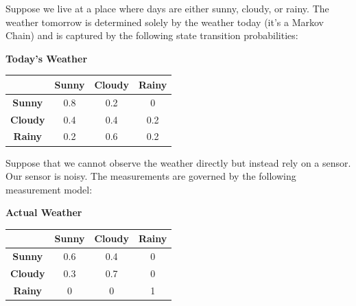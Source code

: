 \documentclass[answers]{exam}
\begin{document}
\begin{questions}

    \question[20]
    Suppose we live at a place where days are either sunny, cloudy, or rainy. The weather tomorrow is determined solely by the weather today (it’s a Markov Chain) and is captured by the following state transition probabilities:
    \begin{center}
        \textbf{Today's Weather} \\
        \begin{tabular}{|c|c|c|c|}
            \hline
            \textbf{}       & \textbf{Sunny} & \textbf{Cloudy} & \textbf{Rainy} \\ \hline
            \textbf{Sunny}  & 0.8            & 0.2             & 0              \\ \hline
            \textbf{Cloudy} & 0.4            & 0.4             & 0.2            \\ \hline
            \textbf{Rainy}  & 0.2            & 0.6             & 0.2            \\ \hline
        \end{tabular}
    \end{center}
    Suppose that we cannot observe the weather directly but instead rely on a sensor. Our sensor is noisy. The measurements are governed by the following measurement model:
    \begin{center}
        \textbf{Actual Weather} \\
        \begin{tabular}{|c|c|c|c|}
            \hline
            \textbf{}       & \textbf{Sunny} & \textbf{Cloudy} & \textbf{Rainy} \\ \hline
            \textbf{Sunny}  & 0.6            & 0.4             & 0              \\ \hline
            \textbf{Cloudy} & 0.3            & 0.7             & 0              \\ \hline
            \textbf{Rainy}  & 0              & 0               & 1              \\ \hline
        \end{tabular}
    \end{center}
    \begin{parts}

\end{parts}
\end{questions}
\end{document}
